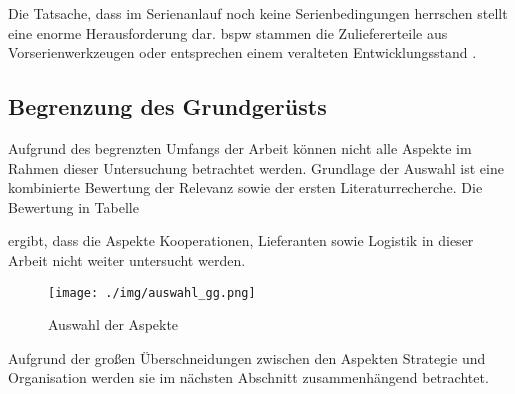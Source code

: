 Die Tatsache, dass im Serienanlauf noch keine Serienbedingungen herrschen stellt eine enorme Herausforderung dar. \Gls{bspw} stammen die Zuliefererteile aus Vorserienwerkzeugen oder entsprechen einem veralteten Entwicklungsstand \cite[21]{Kuhn2002}.

\subsection*{Begrenzung des Grundgerüsts}

Aufgrund des begrenzten Umfangs der Arbeit können nicht alle Aspekte im Rahmen dieser Untersuchung betrachtet werden. Grundlage der Auswahl ist eine kombinierte Bewertung der Relevanz sowie der ersten Literaturrecherche. 
Die Bewertung in Tabelle 
 
ergibt, dass die Aspekte Kooperationen, Lieferanten sowie Logistik in dieser Arbeit nicht weiter untersucht werden. 
\begin{figure}[ht]
 \centering
 \texttt{[image: ./img/auswahl\_gg.png]}
 \caption{Auswahl der Aspekte}
 \label{fig:auswahl_gg}
\end{figure}

Aufgrund der großen Überschneidungen zwischen den Aspekten Strategie und Organisation werden sie im nächsten Abschnitt zusammenhängend betrachtet. 
